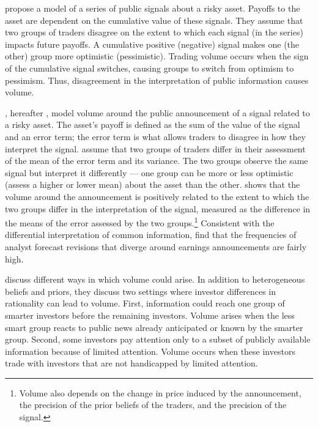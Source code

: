 \documentclass[
  12pt,
  a4paper,
  twoside,
  onecolumn]{article}
\begin{document}
\cite{harris_raviv1993} propose a model of a series of public signals
about a risky asset. Payoffs to the asset are dependent on the
cumulative value of these signals. They assume that two groups of
traders disagree on the extent to which each signal (in the series)
impacts future payoffs. A cumulative positive (negative) signal makes
one (the other) group more optimistic (pessimistic). Trading volume
occurs when the sign of the cumulative signal switches, causing groups
to switch from optimism to pessimism. Thus, disagreement in the
interpretation of public information causes volume.

\cite{kandel_pearson1995}, hereafter ,
model volume around the public announcement of a signal related to a
risky asset. The asset's payoff is defined as the sum of the value of
the signal and an error term; the error term is what allows traders to
disagree in how they interpret the signal.
 assume that two groups of traders differ
in their assessment of the mean of the error term and its variance. The
two groups observe the same signal but interpret it differently --- one
group can be more or less optimistic (assess a higher or lower mean)
about the asset than the other.  shows
that the volume around the announcement is positively related to the
extent to which the two groups differ in the interpretation of the
signal, measured as the difference in the means of the error assessed by
the two groups.\footnote{Volume also depends on the change in price
  induced by the announcement, the precision of the prior beliefs of the
  traders, and the precision of the signal.} Consistent with the
differential interpretation of common information,
 find that the frequencies of analyst
forecast revisions that diverge around earnings announcements are fairly
high.

\cite{hong_stein2007} discuss different ways in which volume could
arise. In addition to heterogeneous beliefs and priors, they discuss two
settings where investor differences in rationality can lead to volume.
First, information could reach one group of smarter investors before the
remaining investors. Volume arises when the less smart group reacts to
public news already anticipated or known by the smarter group. Second,
some investors pay attention only to a subset of publicly available
information because of limited attention. Volume occurs when these
investors trade with investors that are not handicapped by limited
attention.
\end{document}
